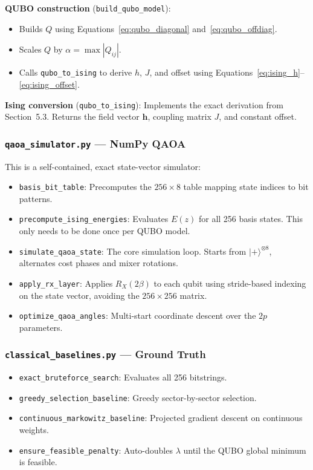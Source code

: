 \documentclass[12pt, a4paper]{article}
\begin{document}
\textbf{QUBO construction} (\texttt{build\_qubo\_model}):
\begin{itemize}
    \item Builds $Q$ using Equations~\ref{eq:qubo_diagonal} and~\ref{eq:qubo_offdiag}.
    \item Scales $Q$ by $\alpha = \max|Q_{ij}|$.
    \item Calls \texttt{qubo\_to\_ising} to derive $h$, $J$, and offset using Equations~\ref{eq:ising_h}--\ref{eq:ising_offset}.
\end{itemize}

\textbf{Ising conversion} (\texttt{qubo\_to\_ising}):
Implements the exact derivation from Section~5.3. Returns the field vector $\mathbf{h}$, coupling matrix $J$, and constant offset.

\subsubsection{\texttt{qaoa\_simulator.py} --- NumPy QAOA}

This is a self-contained, exact state-vector simulator:

\begin{itemize}
    \item \texttt{basis\_bit\_table}: Precomputes the $256 \times 8$ table mapping state indices to bit patterns.
    \item \texttt{precompute\_ising\_energies}: Evaluates $E(z)$ for all 256 basis states. This only needs to be done once per QUBO model.
    \item \texttt{simulate\_qaoa\_state}: The core simulation loop. Starts from $|+\rangle^{\otimes 8}$, alternates cost phases and mixer rotations.
    \item \texttt{apply\_rx\_layer}: Applies $R_X(2\beta)$ to each qubit using stride-based indexing on the state vector, avoiding the $256 \times 256$ matrix.
    \item \texttt{optimize\_qaoa\_angles}: Multi-start coordinate descent over the $2p$ parameters.
\end{itemize}

\subsubsection{\texttt{classical\_baselines.py} --- Ground Truth}

\begin{itemize}
    \item \texttt{exact\_bruteforce\_search}: Evaluates all 256 bitstrings.
    \item \texttt{greedy\_selection\_baseline}: Greedy sector-by-sector selection.
    \item \texttt{continuous\_markowitz\_baseline}: Projected gradient descent on continuous weights.
    \item \texttt{ensure\_feasible\_penalty}: Auto-doubles $\lambda$ until the QUBO global minimum is feasible.
\end{itemize}
\end{document}
